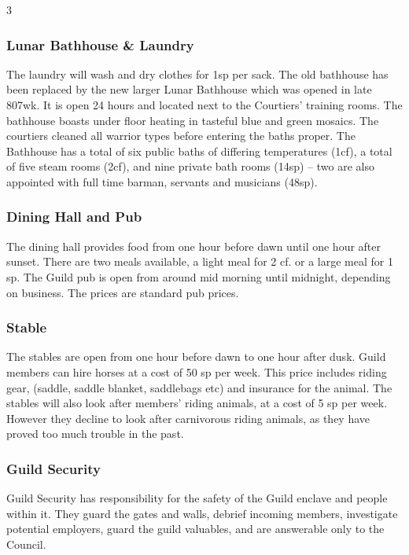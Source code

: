 \begin{multicols}{3}
\subsubsection{Lunar Bathhouse \& Laundry}

The laundry will wash and dry clothes for 1sp per sack. The old
bathhouse has been replaced by the new larger Lunar Bathhouse which
was opened in late 807wk. It is open 24 hours and located next to the
Courtiers’ training rooms. The bathhouse boasts under floor heating in
tasteful blue and green mosaics. The courtiers cleaned all warrior
types before entering the baths proper.  The Bathhouse has a total of
six public baths of differing temperatures (1cf), a total of five
steam rooms (2cf), and nine private bath rooms (14sp) – two are also
appointed with full time barman, servants and musicians (48sp).

\subsubsection{Dining Hall and Pub}

The dining hall provides food from one hour before dawn until one hour
after sunset.  There are two meals available, a light meal for 2
cf. or a large meal for 1 sp.  The Guild pub is open from around mid
morning until midnight, depending on business. The prices are standard
pub prices.

\subsubsection{Stable}

The stables are open from one hour before dawn to one hour after dusk.
Guild members can hire horses at a cost of 50 sp per week. This price
includes riding gear, (saddle, saddle blanket, saddlebags etc) and
insurance for the animal.  The stables will also look after members’
riding animals, at a cost of 5 sp per week.  However they decline to
look after carnivorous riding animals, as they have proved too much
trouble in the past.

\subsubsection{Guild Security}

Guild Security has responsibility for the safety of the Guild enclave
and people within it.  They guard the gates and walls, debrief
incoming members, investigate potential employers, guard the guild
valuables, and are answerable only to the Council.


\end{multicols}
